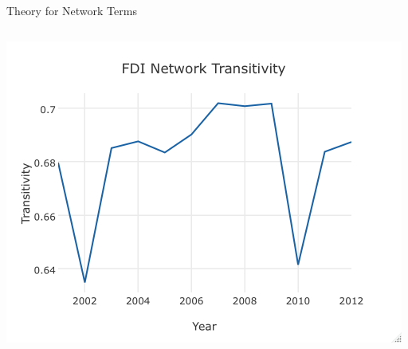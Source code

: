 \documentclass{beamer}
\begin{document}
\begin{frame}{Theory for Network Terms}
\begin{columns}[T]
\begin{column}{.5\textwidth}
    \includegraphics[scale=.3]{slides_figures/transitivity.png}
        \end{column}
  \end{columns}


\end{frame}
\end{document}
